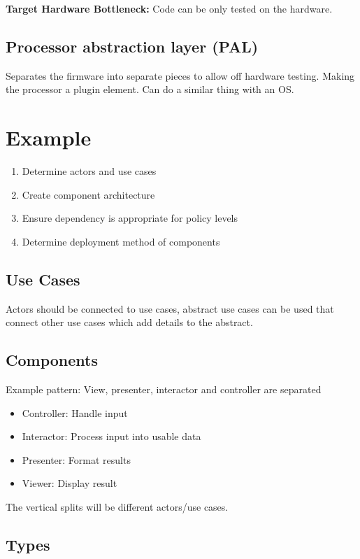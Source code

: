 \documentclass[11pt]{scrartcl} %
\begin{document}
\textbf{Target Hardware Bottleneck:} Code can be only tested on the hardware.

\subsection{Processor abstraction layer (PAL)}

Separates the firmware into separate pieces to allow off hardware testing. Making the processor a 
plugin element. Can do a similar thing with an OS.

\section{Example}

\begin{enumerate}
  \item Determine actors and use cases
  \item Create component architecture
  \item Ensure dependency is appropriate for policy levels
  \item Determine deployment method of components
\end{enumerate}

\subsection{Use Cases}

Actors should be connected to use cases, abstract use cases can be used that connect other use
cases which add details to the abstract.

\subsection{Components}

Example pattern: View, presenter, interactor and controller are separated

\begin{itemize}
  \item Controller: Handle input
  \item Interactor: Process input into usable data
  \item Presenter: Format results
  \item Viewer: Display result
\end{itemize}

The vertical splits will be different actors/use cases.

\subsection{Types}
\end{document}

